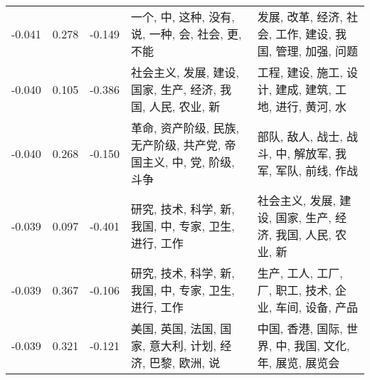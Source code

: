 \begin{tabular}{cccp{5cm}p{5cm}}
-0.041 & 0.278 & -0.149 & 一个, 中, 这种, 没有, 说, 一种, 会, 社会, 更, 不能 & 发展, 改革, 经济, 社会, 工作, 建设, 我国, 管理, 加强, 问题 \\
-0.040 & 0.105 & -0.386 & 社会主义, 发展, 建设, 国家, 生产, 经济, 我国, 人民, 农业, 新 & 工程, 建设, 施工, 设计, 建成, 建筑, 工地, 进行, 黄河, 水 \\
-0.040 & 0.268 & -0.150 & 革命, 资产阶级, 民族, 无产阶级, 共产党, 帝国主义, 中, 党, 阶级, 斗争 & 部队, 敌人, 战士, 战斗, 中, 解放军, 我军, 军队, 前线, 作战 \\
-0.039 & 0.097 & -0.401 & 研究, 技术, 科学, 新, 我国, 中, 专家, 卫生, 进行, 工作 & 社会主义, 发展, 建设, 国家, 生产, 经济, 我国, 人民, 农业, 新 \\
-0.039 & 0.367 & -0.106 & 研究, 技术, 科学, 新, 我国, 中, 专家, 卫生, 进行, 工作 & 生产, 工人, 工厂, 厂, 职工, 技术, 企业, 车间, 设备, 产品 \\
-0.039 & 0.321 & -0.121 & 美国, 英国, 法国, 国家, 意大利, 计划, 经济, 巴黎, 欧洲, 说 & 中国, 香港, 国际, 世界, 中, 我国, 文化, 年, 展览, 展览会 \\
\bottomrule
\end{tabular}
